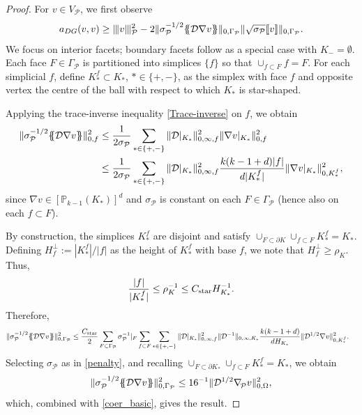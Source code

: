 \documentclass[11pt,final]{amsart}
\theoremstyle{plain}
\theoremstyle{definition}
\newcommand\calP{{\mathcal{P}}}
\newcommand{\mesh}{\calP}
\newcommand{\mean}[1]{\{\kern-1.1mm\{#1\}\kern-1.1mm\}}
\newcommand{\jump}[1]{[\![#1]\!]}                        %
\newcommand{\ndgp}[1]{| \kern -.25mm \|{#1}| \kern -.25mm \|_{\rm \mesh}}
\newcommand{\norm}[2]{\|{#1}\|_{{#2}}}
\renewcommand{\k}{K}
\newcommand{\bnabla}{\nabla_{\kern-.05cm\mesh}^{}}
\begin{document}
\begin{proof}
  For $v\in V_\mesh$, we first observe
  \begin{equation}\label{coer_basic}
    a_{DG}(v,v)\ge\ndgp{v}^2-2\norm{ \sigma_\mesh^{-1/2}\mean{\mathcal{D}\nabla v}}{0,\Gamma_{\mesh} }\norm{ \sqrt{\sigma_\mesh}\jump{v}}{0,\Gamma_{\mesh} }.
  \end{equation}  
  We focus on interior facets; boundary facets follow as a special
  case with $\k_-=\emptyset$. Each face $F\in\Gamma_{\mesh}$ is
  partitioned into simplices $\{f\}$ so that $\cup_{f\subset
    F}f=F$. For each simplicial $f$, define $K^f_*\subset K_*$,
  $*\in\{+,-\}$, as the simplex with face $f$ and opposite vertex the
  centre of the ball with respect to which $K_*$ is star-shaped.
  
  Applying the trace-inverse inequality \eqref{Trace-inverse} on $f$,
  we obtain
  \[
  \begin{aligned}
  \norm{ \sigma_\mesh^{-1/2}\mean{\mathcal{D}\nabla v}}{0,f}^2
  &\le
  \frac{1}{2\sigma_\mesh}
  \sum_{*\in\{+,-\}}\norm{\mathcal{D}|_{\k_*}}{0,\infty,f}^2\norm{ \nabla v|_{K_*}}{0,f}^2\\
  &\le
  \frac{1}{2\sigma_\mesh}
  \sum_{*\in\{+,-\}}\norm{\mathcal{D}|_{\k_*}}{0,\infty,f}^2\frac{k(k-1+d)|f|}{d|K^f_*|}\norm{ \nabla v|_{K_*}}{0,K_*^f}^2,
  \end{aligned}
  \]
  since $\nabla v\in [\mathbb{P}_{k-1}(K_*)]^d$ and $\sigma_\mesh$ is
  constant on each $F\in\Gamma_\mesh$ (hence also on each $f\subset
  F$).

  By construction, the simplices $K^f_*$ are disjoint and satisfy
  $\cup_{F\subset \partial\k} \cup_{f\subset F} K_*^f= K_*$.  Defining
  $H_f^{\perp}:=|K^f_*|/|f|$ as the height of $K^f_*$ with base $f$,
  we note that $H_f^{\perp}\ge \rho_K$. Thus,
  \[
  \frac{|f|}{|K^f_*|}\le  \rho_\k^{-1}\le C_{\rm star} H_{\k_*}^{-1}.
  \]
  Therefore,
  \[
  \begin{aligned}
  \norm{ \sigma_\mesh^{-1/2}\mean{\mathcal{D}\nabla v}}{0,\Gamma_{\calP}}^2
  &\le
  \frac{C_{\rm star}}{2}\sum_{F\subset \Gamma_{\mesh}}\sigma_\mesh^{-1}|_F\sum_{f\subset F}
  \sum_{*\in\{+,-\}}\norm{\mathcal{D}|_{\k_*}}{0,\infty,f}^2\norm{\mathcal{D}^{-1}}{0,\infty,\k_*}\frac{k(k-1+d)}{dH_{\k_*}}\norm{\mathcal{D}^{1/2} \nabla v}{0,\k_*^f}^2.
  \end{aligned}
  \]
  Selecting $\sigma_\mesh$ as in \eqref{penalty}, and recalling
  $\cup_{F\subset \partial\k_*} \cup_{f\subset F} K_*^f= K_*$, we
  obtain
  \begin{equation}\label{indef_est_important}
  \norm{ \sigma_\mesh^{-1/2}\mean{\mathcal{D}\nabla v}}{0,\Gamma_{\calP}}^2
  \le 
  16^{-1}\norm{\mathcal{D}^{1/2} \bnabla v}{0,\Omega}^2,
  \end{equation}
  which, combined with \eqref{coer_basic}, gives the result.
 \end{proof}
 
\end{document}
